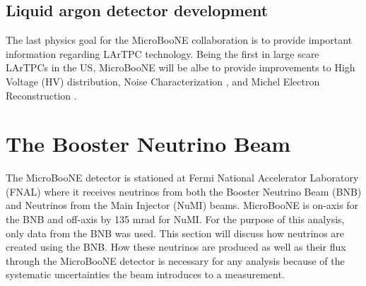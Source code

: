 \subsection{Liquid argon detector development}
The last physics goal for the MicroBooNE collaboration is to provide important information regarding LArTPC technology. Being the first in large scare LArTPCs in the US, MicroBooNE will be albe to provide improvements to High Voltage (HV) distribution, Noise Characterization \cite{noise}, and Michel Electron Reconstruction \cite{michel}. 

\section{The Booster Neutrino Beam}
The MicroBooNE detector is stationed at Fermi National Accelerator Laboratory (FNAL) where it receives neutrinos from both the Booster Neutrino Beam (BNB) and Neutrinos from the Main Injector (NuMI) beams. MicroBooNE is on-axis for the BNB and off-axis by 135 mrad for NuMI. For the purpose of this analysis, only data from the BNB was used. This section will discuss how neutrinos are created using the BNB. How these neutrinos are produced as well as their flux through the MicroBooNE detector is necessary for any analysis because of the systematic uncertainties the beam introduces to a measurement.

